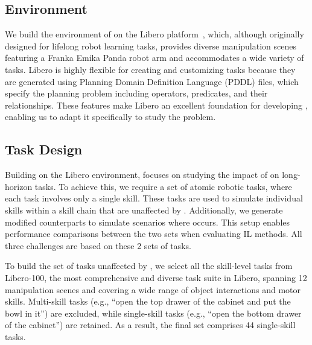 \subsection{Environment}
\label{subsec:bm_env}
We build the environment of \bm on the Libero platform~\cite{liu2024libero}, which, although originally designed for lifelong robot learning tasks, provides diverse manipulation scenes featuring a Franka Emika Panda robot arm and accommodates a wide variety of tasks. Libero is highly flexible for creating and customizing tasks because they are generated using Planning Domain Definition Language (PDDL) files, which specify the planning problem including operators, predicates, and their relationships. These features make Libero an excellent foundation for developing \bm, enabling us to adapt it specifically to study the \pb problem.

\subsection{Task Design}
\label{subsec:bm_task}

Building on the Libero environment, \bm focuses on studying the impact of \pb on long-horizon tasks. To achieve this, we require a set of atomic robotic tasks, where each task involves only a single skill. These tasks are used to simulate individual skills within a skill chain that are unaffected by \pb. Additionally, we generate modified counterparts to simulate scenarios where \pb occurs. This setup enables performance comparisons between the two sets when evaluating IL methods. All three challenges are based on these 2 sets of tasks. 

To build the set of tasks unaffected by \pb, we select all the skill-level tasks from Libero-100, the most comprehensive and diverse task suite in Libero, spanning 12 manipulation scenes and covering a wide range of object interactions and motor skills. Multi-skill tasks (e.g., “open the top drawer of the cabinet and put the bowl in it”) are excluded, while single-skill tasks (e.g., “open the bottom drawer of the cabinet”) are retained. As a result, the final set comprises 44 single-skill tasks. %

